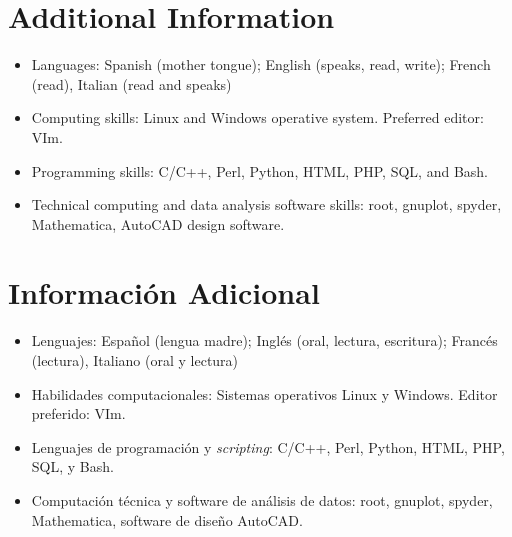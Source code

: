 \ifeng
\section*{Additional Information}

\begin{itemize}
\item Languages: Spanish (mother tongue); English (speaks, read, write); French
(read), Italian (read and speaks)
\item Computing skills: Linux and Windows operative system. Preferred editor:
VIm.
\item Programming skills: C/C++, Perl, Python, HTML, PHP, SQL, and Bash.
\item Technical computing and data analysis software skills: root, gnuplot,
spyder, Mathematica, AutoCAD design software.
\end{itemize}
\else
\section*{Información Adicional}

\begin{itemize}
\item Lenguajes: Español (lengua madre); Inglés (oral, lectura, escritura); Francés (lectura), Italiano (oral y lectura)
\item Habilidades computacionales: Sistemas operativos Linux y Windows. Editor preferido: VIm.
\item Lenguajes de programación y {\emph{scripting}}: C/C++, Perl, Python, HTML, PHP, SQL, y Bash.
\item Computación técnica y software de análisis de datos: root, gnuplot, spyder, Mathematica, software de diseño AutoCAD. 
\end{itemize}
\fi
